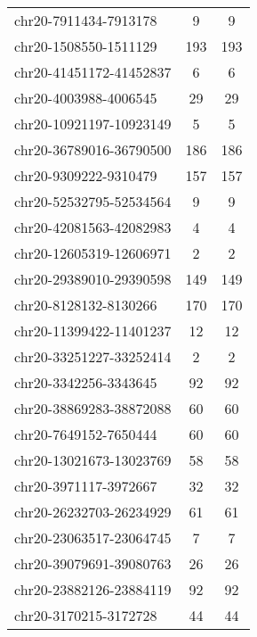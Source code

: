 \begin{longtable}{lSS}
	chr20-7911434-7913178   & 9    & 9                               \\
	chr20-1508550-1511129   & 193  & 193                             \\
	chr20-41451172-41452837 & 6    & 6                               \\
	chr20-4003988-4006545   & 29   & 29                              \\
	chr20-10921197-10923149 & 5    & 5                               \\
	chr20-36789016-36790500 & 186  & 186                             \\
	chr20-9309222-9310479   & 157  & 157                             \\
	chr20-52532795-52534564 & 9    & 9                               \\
	chr20-42081563-42082983 & 4    & 4                               \\
	chr20-12605319-12606971 & 2    & 2                               \\
	chr20-29389010-29390598 & 149  & 149                             \\
	chr20-8128132-8130266   & 170  & 170                             \\
	chr20-11399422-11401237 & 12   & 12                              \\
	chr20-33251227-33252414 & 2    & 2                               \\
	chr20-3342256-3343645   & 92   & 92                              \\
	chr20-38869283-38872088 & 60   & 60                              \\
	chr20-7649152-7650444   & 60   & 60                              \\
	chr20-13021673-13023769 & 58   & 58                              \\
	chr20-3971117-3972667   & 32   & 32                              \\
	chr20-26232703-26234929 & 61   & 61                              \\
	chr20-23063517-23064745 & 7    & 7                               \\
	chr20-39079691-39080763 & 26   & 26                              \\
	chr20-23882126-23884119 & 92   & 92                              \\
	chr20-3170215-3172728   & 44   & 44                              \\

\end{longtable}
